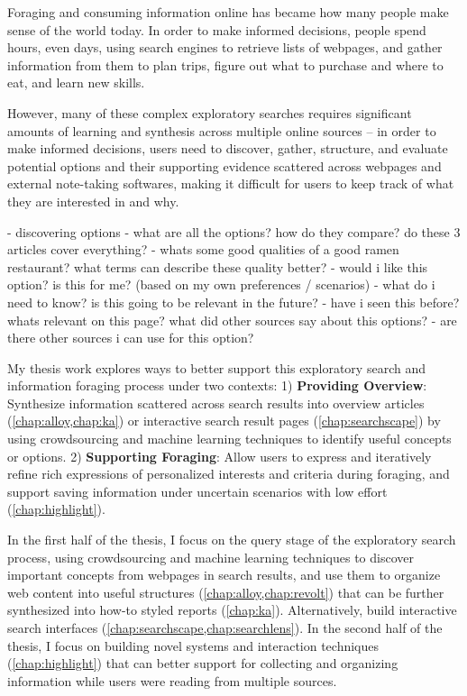 

Foraging and consuming information online has became how many people make sense of the world today. In order to make informed decisions, people spend hours, even days, using search engines to retrieve lists of webpages, and gather information from them to plan trips, figure out what to purchase and where to eat, and learn new skills.

However, many of these complex exploratory searches requires significant amounts of learning and synthesis across multiple online sources -- in order to make informed decisions, users need to discover, gather, structure, and evaluate potential options and their supporting evidence scattered across webpages and external note-taking softwares, making it difficult for users to keep track of what they are interested in and why.


- discovering options - what are all the options? how do they compare? do these 3 articles cover everything?
- whats some good qualities of a good ramen restaurant? what terms can describe these quality better?
- would i like this option? is this for me? (based on my own preferences / scenarios)
- what do i need to know? is this going to be relevant in the future?
- have i seen this before? whats relevant on this page? what did other sources say about this options?
- are there other sources i can use for this option?


My thesis work explores ways to better support this exploratory search and information foraging process under two contexts:
1) \textbf{Providing Overview}: Synthesize information scattered across search results into overview articles (\cref{chap:alloy,chap:ka}) or interactive search result pages (\cref{chap:searchscape}) by using  crowdsourcing and machine learning techniques to identify useful concepts or options.
2) \textbf{Supporting Foraging}: Allow users to express and iteratively refine rich expressions of personalized interests and criteria during foraging, and support saving information under uncertain scenarios with low effort (\cref{chap:highlight}).



In the first half of the thesis, I focus on the query stage of the exploratory search process, using crowdsourcing and machine learning techniques to discover important concepts from webpages in search results, and use them to organize web content into useful structures (\cref{chap:alloy,chap:revolt}) that can be further synthesized into how-to styled reports (\cref{chap:ka}). Alternatively, build interactive search interfaces (\cref{chap:searchscape,chap:searchlens}). In the second half of the thesis, I focus on building novel systems and interaction techniques (\cref{chap:highlight}) that can better support for collecting and organizing information while users were reading from multiple sources.


